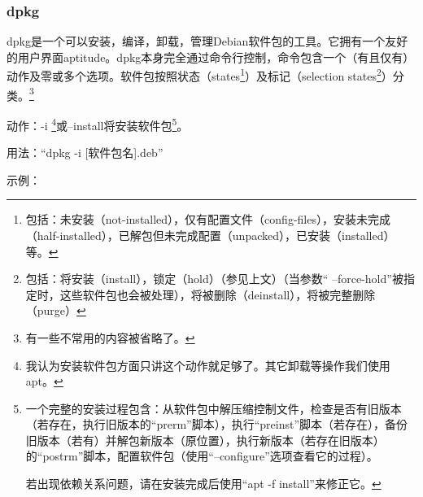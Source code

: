 \documentclass{book}
\begin{document}
\subsubsection{dpkg}
\cite{mandpkg}\par
dpkg是一个可以安装，编译，卸载，管理Debian软件包的工具。它拥有一个友好的用户界面aptitude。dpkg本身完全通过命令行控制，命令包含一个（有且仅有）动作及零或多个选项。软件包按照状态（states\footnote{包括：未安装（not-installed），仅有配置文件（config-files），安装未完成（half-installed），已解包但未完成配置（unpacked），已安装（installed）等。}）及标记（selection states\footnote{包括：将安装（install），锁定（hold）（参见上文）（当参数“ --force-hold”被指定时，这些软件包也会被处理），将被删除（deinstall），将被完整删除（purge）}）分类。\footnote{有一些不常用的内容被省略了。}\par
动作：-i \footnote{我认为安装软件包方面只讲这个动作就足够了。其它卸载等操作我们使用apt。}或--install将安装软件包\footnote{一个完整的安装过程包含：从软件包中解压缩控制文件，检查是否有旧版本（若存在，执行旧版本的“prerm”脚本），执行“preinst”脚本（若存在），备份旧版本（若有）并解包新版本（原位置），执行新版本（若存在旧版本）的“postrm”脚本，配置软件包（使用“--configure”选项查看它的过程）。\par 若出现依赖关系问题，请在安装完成后使用“apt -f install”来修正它。}。\par
用法：“dpkg -i [软件包名].deb”\par
示例：
\end{document}
